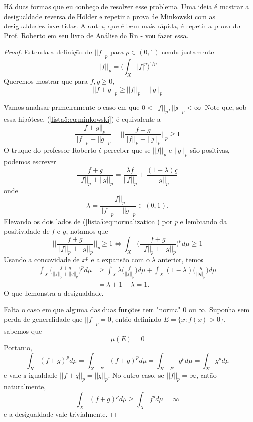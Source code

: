\begin{problem}
    \label{prob:l5:5}
\end{problem}
Há duas formas que eu conheço de resolver esse problema. Uma ideia é mostrar a desigualdade reversa de Hölder e 
repetir a prova de Minkowski com as desigualdades invertidas. A outra, que é bem mais rápida, é repetir a prova do Prof. Roberto
em seu livro de Análise do Rn - vou fazer essa.
\begin{proof}
    Estenda a definição de $||f||_p$ para $p \in (0,1)$ sendo justamente
    $$||f||_p = \bigg( \int_X |f|^p \bigg)^{1/p}$$
    Queremos mostrar que para $f,g \geq 0$,
    \begin{equation}
        \label{lista5:eq:minkowski}
        ||f + g||_p \geq ||f||_p + ||g||_p
    \end{equation}
    
    
    Vamos analisar primeiramente o caso em que $0 < ||f||_p, ||g||_p < \infty$. Note que, sob essa hipótese, (\ref{lista5:eq:minkowski}) é equivalente a
    \begin{equation}
        \label{lista5:eq:normalization}
        \frac{||f + g||_p}{||f||_p + ||g||_p} = \bigg|\bigg|\frac{f + g}{||f||_p + ||g||_p}\bigg|\bigg|_p \geq 1
    \end{equation}
    O truque do professor Roberto é perceber que se $||f||_p$ e $||g||_p$ são positivas,
    podemos escrever
    $$\frac{f + g}{||f||_p + ||g||_p} =  \frac{\lambda f}{||f||_p} + \frac{(1-\lambda)g}{||g||_p}$$
    onde
    $$\lambda = \frac{||f||_p}{||f||_p + ||g||_p} \in (0,1).$$
    Elevando os dois lados de (\ref{lista5:eq:normalization}) por $p$ e lembrando da positividade de $f$ e $g$, notamos que
    $$\bigg|\bigg|\frac{f + g}{||f||_p + ||g||_p}\bigg|\bigg|_p \geq 1 \iff \int_X \bigg(\frac{f + g}{||f||_p + ||g||_p}\bigg)^p d\mu \geq 1$$
    Usando a concavidade de $x^p$ e  a expansão com o $\lambda$ anterior, temos
    \begin{align*}
        \int_X \bigg(\frac{f + g}{||f||_p + ||g||_p}\bigg)^p d\mu &\geq \int_X \lambda \bigg(\frac{f}{||f||_p}\bigg) d\mu + \int_X (1-\lambda) \bigg(\frac{g}{||g||_p}\bigg) d\mu\\
        &= \lambda + 1 - \lambda = 1.
    \end{align*}
    O que demonstra a desigualdade.

    Falta o caso em que alguma das duas funções tem "norma" $0$ ou $\infty$. Suponha sem perda de generalidade que  $||f||_p = 0$,
    então definindo $E = \{x : f(x) > 0\}$, sabemos que 
    $$\mu(E) = 0$$
    Portanto,
    $$\int_X (f+g)^p d\mu= \int_{X - E} (f+g)^p d\mu= \int_{X - E} g^p d\mu= \int_X g^p d\mu$$
    e vale a igualdade $||f + g||_p = ||g||_p$. No outro caso, se $||f||_p = \infty$, 
    então naturalmente,
    $$\int_X (f + g)^p d\mu \geq \int_X f^p d\mu = \infty$$
    e a desigualdade vale trivialmente.
\end{proof}

